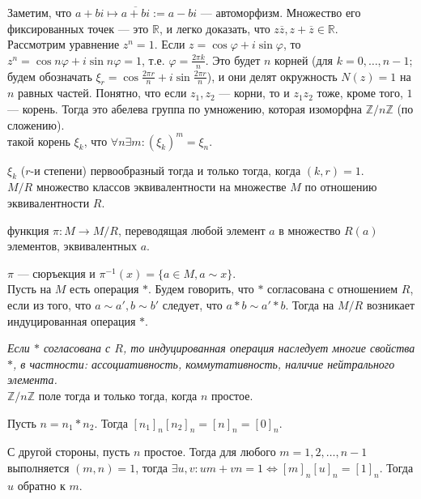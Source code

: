 \documentclass[12pt,a4paper]{article}
\begin{document}
Заметим, что $a+bi\mapsto \overline{a+bi}:=a-bi$ --- автоморфизм. Множество его фиксированных точек --- это $\mathbb R$, и легко доказать, что $z\overline{z},z+\overline{z}\in \mathbb R$.\\

Рассмотрим уравнение $z^n=1$. Если $z=\cos\varphi+i\sin\varphi$, то $z^n=\cos n\varphi+i\sin n\varphi=1$, т.е. $\varphi=\frac{2\pi k}{n}$. Это будет $n$ корней (для $k=0,\ldots ,n-1$; будем обозначать $\xi_r=\cos\frac{2\pi r}{n}+i\sin\frac{2\pi r}{n}$), и они делят окружность $N(z)=1$ на $n$ равных частей. Понятно, что если $z_1,z_2$ --- корни, то и $z_1z_2$ тоже, кроме того, $1$ --- корень. Тогда это абелева группа по умножению, которая изоморфна $\mathbb Z / n\mathbb Z$ (по сложению).\\

 такой корень $\xi_k$, что $\forall n\exists m:(\xi_k)^m=\xi_n$.

\lemma $\xi_k$ ($r$-и степени) первообразный тогда и только тогда, когда $(k,r)=1$.\\

 $M /R$ множество классов эквивалентности на множестве $M$ по отношению эквивалентности $R$.

 функция $\pi:M\to M /R$, переводящая любой элемент $a$ в множество $R(a)$ элементов, эквивалентных $a$.

\lemma $\pi$ --- сюръекция и $\pi^{-1}(x)=\{a\in M,a\sim x\}$.\\

Пусть на $M$ есть операция $*$. Будем говорить, что $*$ согласована с отношением $R$, если из того, что $a\sim a',b\sim b'$ следует, что $a*b\sim a'*b$. Тогда на $M /R$ возникает индуцированная операция $*$.

\textit{Если $*$ согласована с $R$, то индуцированная операция наследует многие свойства $*$, в частности: ассоциативность, коммутативность, наличие нейтрального элемента.}\\

\theorem $ \mathbb Z /n\mathbb Z$ поле тогда и только тогда, когда $n$ простое.

\proof Пусть $n=n_1*n_2$. Тогда $[n_1]_n[n_2]_n=[n]_n=[0]_n$.

С другой стороны, пусть $n$ простое. Тогда для любого $m=1,2,\ldots ,n-1$ выполняется $(m,n)=1$, тогда $\exists u,v:um+vn=1\iff [m]_n [u]_n= [1]_n$. Тогда $u$ обратно к $m$.\QEDA\\
\end{document}
